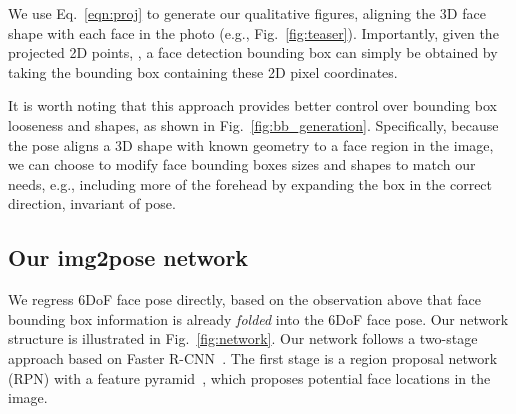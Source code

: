 \documentclass[final]{cvpr}
\begin{document}
We use Eq.~\eqref{eqn:proj} to generate our qualitative figures, aligning the 3D face shape with each face in the photo (e.g., Fig.~\ref{fig:teaser}). Importantly, given the projected 2D points, , a face detection bounding box can simply be obtained by taking the bounding box containing these 2D pixel coordinates. 

It is worth noting that this approach provides better control over bounding box looseness and shapes, as shown in Fig.~\ref{fig:bb_generation}. Specifically, because the pose aligns a 3D shape with known geometry to a face region in the image, we can choose to modify face bounding boxes sizes and shapes to match our needs, e.g., including more of the forehead by expanding the box in the correct direction, invariant of pose.

\begin{figure}[!t]
\end{figure}


\subsection{Our img2pose network}
\label{sec:network}
We regress 6DoF face pose directly, based on the observation above that face bounding box information is already {\em folded} into the 6DoF face pose. Our network structure is illustrated in Fig.~\ref{fig:network}. Our network follows a two-stage approach based on Faster R-CNN~\cite{faster_rcnn}. The first stage is a region proposal network (RPN) with a feature pyramid~\cite{fpn}, which proposes potential face locations in the image. 

\begin{figure*}[ht]
\end{figure*}
\end{document}
